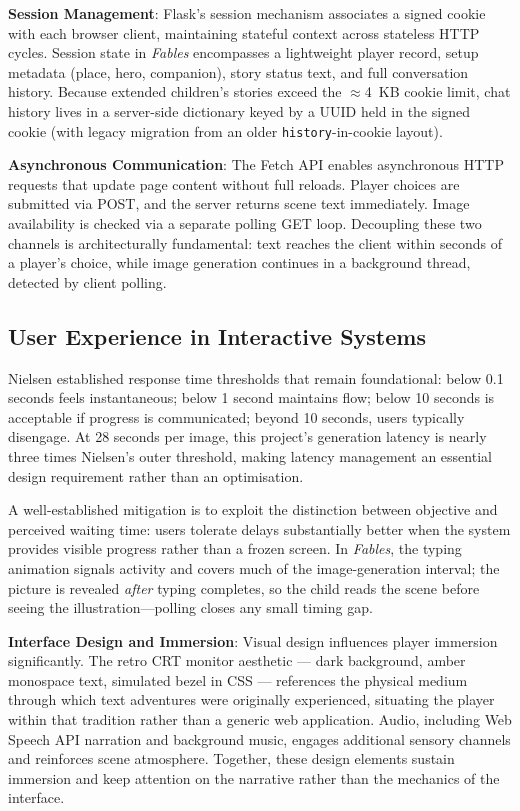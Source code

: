 \documentclass[12pt,a4paper]{article}
\begin{document}
\textbf{Session Management}: Flask's session mechanism associates a signed cookie with each browser client, maintaining stateful context across stateless HTTP cycles. Session state in \textit{Fables} encompasses a lightweight player record, setup metadata (place, hero, companion), story status text, and full conversation history. Because extended children's stories exceed the $\approx$4~KB cookie limit, chat history lives in a server-side dictionary keyed by a UUID held in the signed cookie (with legacy migration from an older \texttt{history}-in-cookie layout).

\textbf{Asynchronous Communication}: The Fetch API enables asynchronous HTTP requests that update page content without full reloads. Player choices are submitted via POST, and the server returns scene text immediately. Image availability is checked via a separate polling GET loop. Decoupling these two channels is architecturally fundamental: text reaches the client within seconds of a player's choice, while image generation continues in a background thread, detected by client polling.

    \subsection{User Experience in Interactive Systems}

Nielsen \cite{nielsen1994usability} established response time thresholds that remain foundational: below 0.1 seconds feels instantaneous; below 1 second maintains flow; below 10 seconds is acceptable if progress is communicated; beyond 10 seconds, users typically disengage. At 28 seconds per image, this project's generation latency is nearly three times Nielsen's outer threshold, making latency management an essential design requirement rather than an optimisation.

A well-established mitigation is to exploit the distinction between objective and perceived waiting time: users tolerate delays substantially better when the system provides visible progress rather than a frozen screen. In \textit{Fables}, the typing animation signals activity and covers much of the image-generation interval; the picture is revealed \emph{after} typing completes, so the child reads the scene before seeing the illustration---polling closes any small timing gap.

\textbf{Interface Design and Immersion}: Visual design influences player immersion significantly. The retro CRT monitor aesthetic --- dark background, amber monospace text, simulated bezel in CSS --- references the physical medium through which text adventures were originally experienced, situating the player within that tradition rather than a generic web application. Audio, including Web Speech API narration and background music, engages additional sensory channels and reinforces scene atmosphere. Together, these design elements sustain immersion and keep attention on the narrative rather than the mechanics of the interface.
\end{document}
